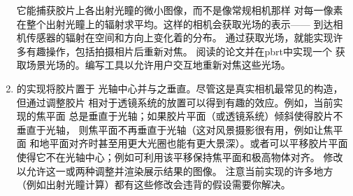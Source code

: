 \begin{enumerate}
      它能捕获胶片上各出射光瞳的微小图像，而不是像常规相机那样
      对每一像素在整个出射光瞳上的辐射求平均。这样的相机会获取光场的表示——
      到达相机传感器的辐射在空间和方向上变化着的分布。
      通过获取光场，就能实现许多有趣操作，包括拍摄相片后重新对焦。
      阅读\citeauthor{ng:hal-02551481}的论文并在pbrt中实现一个
      获取场景光场的。编写工具以允许用户交互地重新对焦这些光场。
      \item \circlethree {}的实现将胶片置于
      光轴中心并与之垂直。尽管这是真实相机最常见的构造，但通过调整胶片
      相对于透镜系统的放置可以得到有趣的效应。例如，当前实现的焦平面
      总是垂直于光轴；如果胶片平面（或透镜系统）倾斜使得胶片不垂直于光轴，
      则焦平面不再垂直于光轴（这对风景摄影很有用，例如让焦平面
      和地平面对齐时甚至用更大光圈也能有更大景深）。或者可以平移胶片平面
      使得它不在光轴中心；例如可利用该平移保持焦平面和极高物体对齐。
      修改以允许这一或两种调整并渲染展示结果的图像。
      注意当前实现的许多地方（例如出射光瞳计算）都有这些修改会违背的假设需要你解决。
\end{enumerate}